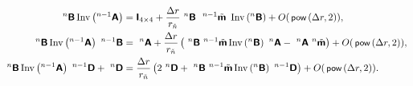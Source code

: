 \documentclass[preprint,12pt,times]{elsarticle}
\newcommand{\minus}[1]{\check{#1}}
\numberwithin{equation}{section}
\renewcommand{\u}[1]{\boldsymbol{#1}}
\newcommand{\usf}[1]{\u{\mathsf #1}}
\newcommand{\pr}[1]{\left( #1 \right)}
\newcommand{\p}{\,\textsf{\small pow}}
\newcommand{\Inv}{\,\mathrm{Inv}}
\renewcommand{\>}{$\Rightarrow$}
\begin{document}

\begin{subequations}
  \begin{align}
    ~^{n}{\usf{B}} \Inv\pr{{}^{{n-1}}\usf{A}}
    & = \usf{I}_{4\times 4} + \frac{\Delta r}{r_{\minus{n}}} ~^{n}{\usf{B}}\  ~^{n-1}\tilde{\usf{m}}\  \Inv\pr{{}^{n}\usf{B}} + O(\p\pr{\Delta r,2}),\\
    ~^{n}{\usf{B}} \Inv\pr{{}^{{n-1}}\usf{A}} ~^{{n-1}}{\usf{B}}
    & = ~^{n}\usf{A} + \frac{\Delta r}{r_{\minus{n}}} \left( ~^{n}{\usf{B}} ~^{n-1}\tilde{\usf{m}} \Inv\pr{{}^{n}\usf{B}} ~^{n}\usf{A} - ~^{n}{\usf{A}} ~^{n}\tilde{\usf{m}} \right) + O(\p\pr{\Delta r,2}),\\
    ~^{n}{\usf{B}} \Inv\pr{{}^{{n-1}}\usf{A}} ~^{{n-1}}{\usf{D}} + ~^{n}{\usf{D}}
    & = \frac{\Delta r}{r_{\minus{n}}} \left( 2~^{n}{\usf{D}} + ~^{n}{\usf{B}} ~^{n-1}\tilde{\usf{m}} \Inv\pr{{}^{n}\usf{B}} ~^{{n-1}}{\usf{D}} \right) + O(\p\pr{\Delta r,2}).
  \end{align}
  \label{eq:C5}
\end{subequations}
\end{document}

